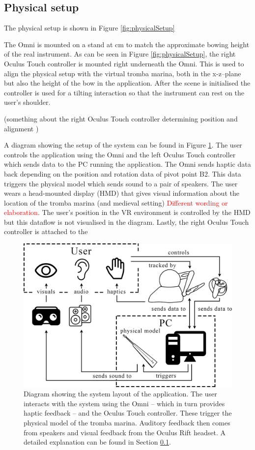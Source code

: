 \documentclass[dvipsnames, pdftex]{article}
\def\SWcomment[#1]{\textcolor{Red}{#1}}
\begin{document}
\subsection{Physical setup}\label{subsec:physicalSetup}
The physical setup is shown in Figure \ref{fig:physicalSetup}

The Omni is mounted on a stand at  cm to match the approximate bowing height of the real instrument. As can be seen in Figure \ref{fig:physicalSetup}, the right Oculus Touch controller is mounted right underneath the Omni. This is used to align the physical setup with the virtual tromba marina, both in the x-z--plane but also the height of the bow in the application. After the scene is initialised the controller is used for a tilting interaction so that the instrument can rest on the user's shoulder. 

(something about the right Oculus Touch controller determining position and alignment )

A diagram showing the setup of the system can be found in Figure \ref{fig:systemLayout}. The user controls the application using the Omni and the left Oculus Touch controller which sends data to the PC running the application. The Omni sends haptic data back depending on the position and rotation data of pivot point B2. This data triggers the physical model which sends sound to a pair of speakers. The user wears a head-mounted display (HMD) that gives visual information about the location of the tromba marina (and medieval setting) \SWcomment[Different wording or elaboration]. The user's position in the VR environment is controlled by the HMD but this dataflow is not visualised in the diagram. Lastly, the right Oculus Touch controller is attached to the 

\begin{figure}[ht]\includegraphics[width=1.0\columnwidth]{SMC 2020 paper template LaTeX/figures/blockdiagram.png}
\centering
  \caption{Diagram showing the system layout of the application. The user interacts with the system using the Omni -- which in turn provides haptic feedback -- and the Oculus Touch controller. These trigger the physical model of the tromba marina. Auditory feedback then comes from speakers and visual feedback from the Oculus Rift headset. A detailed explanation can be found in Section \ref{subsec:physicalSetup}. \label{fig:systemLayout}}
\end{figure}
\end{document}
